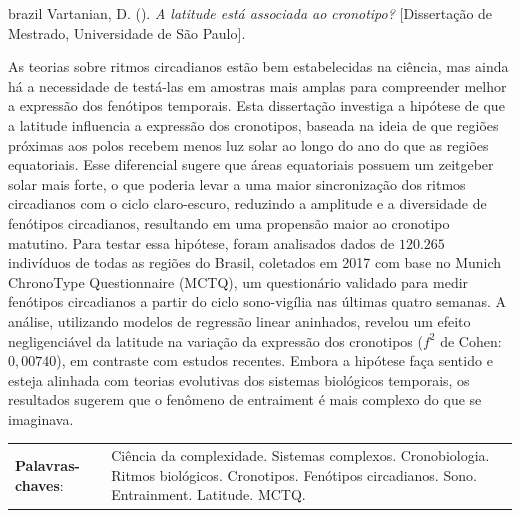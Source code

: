 \documentclass[
12pt,
openright,
oneside,
a4paper,
chapter=TITLE,
section=TITLE,
french,
spanish,
brazil,
english
]{abntex2}\usepackage{array}
\newcommand{\resumoestrangeironame}{Resumo}
\renewcommand{\resumoname}{Abstract}
\renewcommand{\resumoestrangeironame}{Resumo}
\renewcommand{\resumoname}{Resumo}
\renewcommand{\resumoestrangeironame}{Abstract}
\renewcommand{\resumoname}{Resumen}
\renewcommand{\resumoestrangeironame}{Resumo}
\renewcommand{\resumoname}{Résumé}
\renewcommand{\resumoestrangeironame}{Resumo}
\newenvironment{resumoenv}[1][\resumoname]{
  \pretextualchapter{#1}
  \begingroup
  \setlength{\parindent}{0cm}
  \setlength{\parskip}{\smallskipamount} %
  \AtBeginEnvironment{tabular}{\normalsize}
  \renewcommand{\arraystretch}{1}
  \setlength{\aboverulesep}{0ex}
  \setlength{\belowrulesep}{0ex}
  \setlength{\arrayrulewidth}{0pt}
  \setlength{\tabcolsep}{0cm}
  \vspace{-\smallskipamount} %
  \begin{SingleSpace}
}{
  \end{SingleSpace}
  \cleardoublepage
  \endgroup
}
\begin{document}
\begin{resumoenv}[\resumoestrangeironame]
\begin{otherlanguage*}{brazil}
Vartanian, D. ({\imprimirdata}). \textit{A latitude está associada ao cronotipo?} [Dissertação de Mestrado, Universidade de São Paulo].


As teorias sobre ritmos circadianos estão bem estabelecidas na ciência,
mas ainda há a necessidade de testá-las em amostras mais amplas para
compreender melhor a expressão dos fenótipos temporais. Esta dissertação
investiga a hipótese de que a latitude influencia a expressão dos
cronotipos, baseada na ideia de que regiões próximas aos polos recebem
menos luz solar ao longo do ano do que as regiões equatoriais. Esse
diferencial sugere que áreas equatoriais possuem um zeitgeber solar mais
forte, o que poderia levar a uma maior sincronização dos ritmos
circadianos com o ciclo claro-escuro, reduzindo a amplitude e a
diversidade de fenótipos circadianos, resultando em uma propensão maior
ao cronotipo matutino. Para testar essa hipótese, foram analisados dados
de \(120.265\) indivíduos de todas as regiões do Brasil, coletados em
2017 com base no Munich ChronoType Questionnaire (MCTQ), um questionário
validado para medir fenótipos circadianos a partir do ciclo sono-vigília
nas últimas quatro semanas. A análise, utilizando modelos de regressão
linear aninhados, revelou um efeito negligenciável da latitude na
variação da expressão dos cronotipos (\(f^2\) de Cohen: \(0,00740\)), em
contraste com estudos recentes. Embora a hipótese faça sentido e esteja
alinhada com teorias evolutivas dos sistemas biológicos temporais, os
resultados sugerem que o fenômeno de entraiment é mais complexo do que
se imaginava.


\begin{tabular}{p{3.6cm} p{12.3cm}}
  \textbf{Palavras-chaves}: &  Ciência da complexidade. Sistemas complexos. Cronobiologia. Ritmos biológicos. Cronotipos. Fenótipos circadianos. Sono. Entrainment. Latitude. MCTQ.
\end{tabular}
\end{otherlanguage*}
\end{resumoenv}
\end{document}

